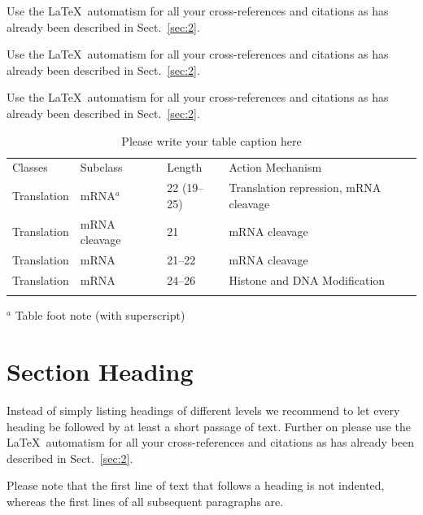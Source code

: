 \documentclass[graybox]{svmult}
\begin{document}
 Use the \LaTeX\ automatism for all your cross-references and citations as has already been described in Sect.~\ref{sec:2}.

 Use the \LaTeX\ automatism for all your cross-refer\-ences and citations as has already been described in Sect.~\ref{sec:2}.

 Use the \LaTeX\ automatism for all your cross-refer\-ences and citations as has already been described in Sect.~\ref{sec:2}.
%
%
\begin{table}[!t]
\caption{Please write your table caption here}
\label{tab:1}       %
%
%
\begin{tabular}{p{2cm}p{2.4cm}p{2cm}p{4.9cm}}
\hline\noalign{\smallskip}
Classes & Subclass & Length & Action Mechanism  \\
\noalign{\smallskip}\svhline\noalign{\smallskip}
Translation & mRNA$^a$  & 22 (19--25) & Translation repression, mRNA cleavage\\
Translation & mRNA cleavage & 21 & mRNA cleavage\\
Translation & mRNA  & 21--22 & mRNA cleavage\\
Translation & mRNA  & 24--26 & Histone and DNA Modification\\
\noalign{\smallskip}\hline\noalign{\smallskip}
\end{tabular}
$^a$ Table foot note (with superscript)
\end{table}
%
\section{Section Heading}
\label{sec:3}
Instead of simply listing headings of different levels we recommend to let every heading be followed by at least a short passage of text.  Further on please use the \LaTeX\ automatism for all your cross-references and citations as has already been described in Sect.~\ref{sec:2}.

Please note that the first line of text that follows a heading is not indented, whereas the first lines of all subsequent paragraphs are.
\end{document}
